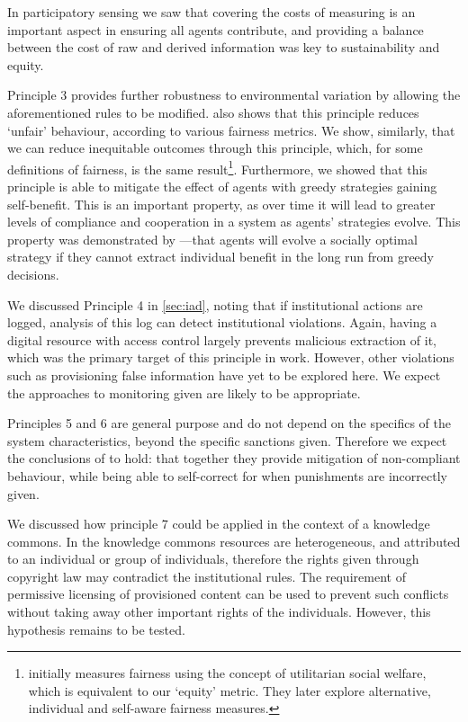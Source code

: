 In participatory sensing we saw that covering the costs of measuring is an
important aspect in ensuring all agents contribute, and providing a balance
between the cost of raw and derived information was key to sustainability and
equity.

Principle 3 provides further robustness to environmental variation by allowing
the aforementioned rules to be modified. \citet{Schaumeier2013} also shows
that this principle reduces `unfair' behaviour, according to various fairness
metrics. We show, similarly, that we can reduce inequitable outcomes through
this principle, which, for some definitions of fairness, is the same
result\footnote{\citet{Schaumeier2013} initially measures fairness using the
concept of utilitarian social welfare, which is equivalent to our `equity'
metric. They later explore alternative, individual and self-aware fairness
measures.}. Furthermore, we showed that this principle is able to mitigate the
effect of agents with greedy strategies gaining self-benefit. This is an
important property, as over time it will lead to greater levels of compliance
and cooperation in a system as agents' strategies evolve. This property was
demonstrated by \citet{Axelrod1984}---that agents will evolve a socially
optimal strategy if they cannot extract individual benefit in the long run
from greedy decisions.

We discussed Principle 4 in \autoref{sec:iad}, noting that if institutional
actions are logged, analysis of this log can detect institutional violations.
Again, having a digital resource with access control largely prevents
malicious extraction of it, which was the primary target of this principle in
 work. However, other violations such as
provisioning false information have yet to be explored here. We expect the
approaches to monitoring given are likely to be appropriate. %

Principles 5 and 6 are general purpose and do not depend on the specifics of
the system characteristics, beyond the specific sanctions given. Therefore we
expect the conclusions of \citet{Pitt2012b,Schaumeier2013} to hold: that
together they provide mitigation of non-compliant behaviour, while being able
to self-correct for when punishments are incorrectly given.

We discussed how principle 7 could be applied in the context of a knowledge
commons. In the knowledge commons resources are heterogeneous, and attributed
to an individual or group of individuals, therefore the rights given through
copyright law may contradict the institutional rules. The requirement of
permissive licensing of provisioned content can be used to prevent such
conflicts without taking away other important rights of the individuals.
However, this hypothesis remains to be tested.

